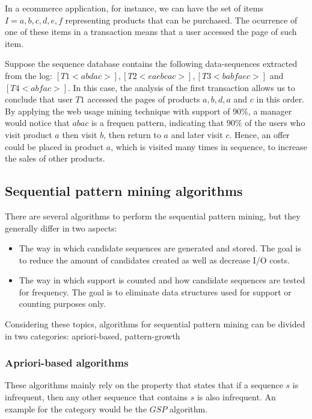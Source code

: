 In a ecommerce application, for instance, we can have the set of items $I = {a, b, c, d, e, f}$ representing products that can be purchased. The ocurrence of one of these items in a transaction means that a user accessed the page of such item.

Suppose the sequence database contains the following data-sequences extracted from the log: $[T1 <abdac>], [T2 <eaebcac>], [T3 <babfaec>]$ and $[T4 <abfac>]$. In this case, the analysis of the first transaction allows us to conclude that user $T1$ accessed the pages of products $a,b,d,a$ and $c$ in this order. By applying the web usage mining technique with support of 90\%, a manager would notice that $abac$ is a frequen pattern, indicating that $90\%$ of the users who visit product $a$ then visit $b$, then return to $a$ and later visit $c$. Hence, an offer could be placed in product $a$, which is visited many times in sequence, to increase the sales of other products. 


\subsection{Sequential pattern mining algorithms}

There are several algorithms to perform the sequential pattern mining, but they generally differ in two aspects\cite{Nizar}:

\begin{itemize}

\item The way in which candidate sequences are generated and stored. The goal is to reduce the amount of candidates created as well as decrease I/O costs.

\item The way in which support is counted and how candidate sequences are tested for frequency. The goal is to eliminate data structures used for support or counting purposes only.

\end{itemize}

Considering these topics, algorithms for sequential pattern mining can be divided in two categories: apriori-based, pattern-growth

\subsubsection{Apriori-based algorithms}

These algorithms mainly rely on the property that states that if a sequence $s$ is infrequent, then any other sequence that contains $s$ is also infrequent. An example for the category would be the $GSP$\cite{Rakesh} algorithm.

